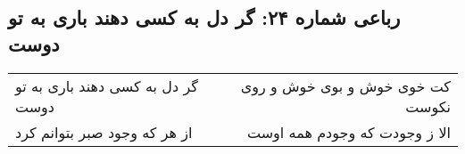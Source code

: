 \begin{center}
\section*{رباعی شماره ۲۴: گر دل به کسی دهند باری به تو دوست}
\label{sec:024}
\begin{longtable}{l p{0.5cm} r}
گر دل به کسی دهند باری به تو دوست
&&
کت خوی خوش و بوی خوش و روی نکوست
\\
از هر که وجود صبر بتوانم کرد
&&
الا ز وجودت که وجودم همه اوست
\\
\end{longtable}
\end{center}
